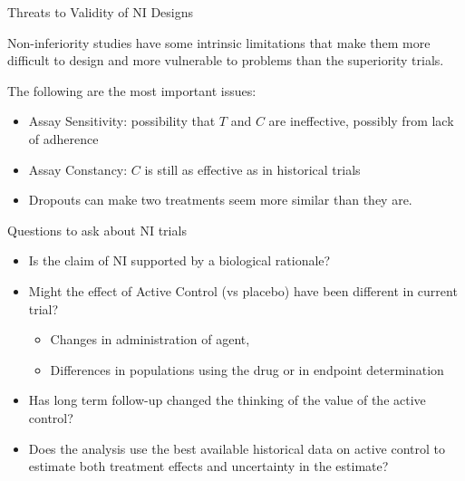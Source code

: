 \documentclass[ignorenonframetext,]{beamer}
\providecommand{\tightlist}{%
  \setlength{\itemsep}{0pt}\setlength{\parskip}{0pt}}
\begin{document}
\begin{frame}{%
\protect\hypertarget{threats-to-validity-of-ni-designs}{%
Threats to Validity of NI Designs}}

Non-inferiority studies have some intrinsic limitations that make them
more difficult to design and more vulnerable to problems than the
superiority trials. \medskip

The following are the most important issues:

\begin{itemize}
\item
  Assay Sensitivity: possibility that \(T\) and \(C\) are ineffective,
  possibly from lack of adherence
\item
  Assay Constancy: \(C\) is still as effective as in historical trials
\item
  Dropouts can make two treatments seem more similar than they are.
\end{itemize}

\end{frame}

\begin{frame}{%
\protect\hypertarget{questions-to-ask-about-ni-trials}{%
Questions to ask about NI trials}}

\begin{itemize}
\item
  Is the claim of NI supported by a biological rationale?
\item
  Might the effect of Active Control (vs placebo) have been different in
  current trial?

  \begin{itemize}
  \tightlist
  \item
    Changes in administration of agent,\\
  \item
    Differences in populations using the drug or in endpoint
    determination
  \end{itemize}
\item
  Has long term follow-up changed the thinking of the value of the
  active control?
\item
  Does the analysis use the best available historical data on active
  control to estimate both treatment effects and uncertainty in the
  estimate?
\end{itemize}

\end{frame}
\end{document}
